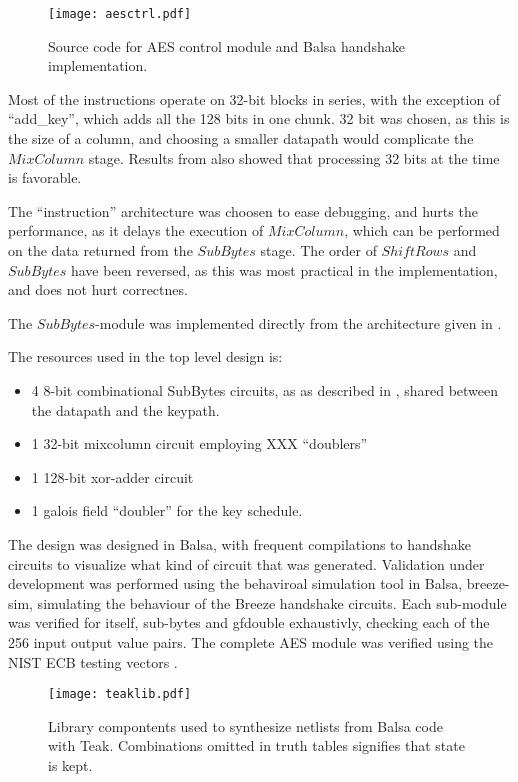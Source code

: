 \begin{figure}[htbp]
  \centering
  \texttt{[image: aesctrl.pdf]}
  \caption{Source code for AES control module and Balsa handshake
    implementation.}
  \label{fig:aesctrl}
\end{figure}

Most of the instructions operate on 32-bit blocks in series, with the
exception of ``add\_key'', which adds all the 128 bits in one
chunk. 32 bit was chosen, as this is the size of a column, and
choosing a smaller datapath would complicate the $MixColumn$
stage. Results from \cite{ekelund} also showed that processing 32 bits
at the time is favorable.

The ``instruction'' architecture was choosen to ease debugging, and
hurts the performance, as it delays the execution of $MixColumn$,
which can be performed on the data returned from the $SubBytes$
stage. The order of $ShiftRows$ and $SubBytes$ have been reversed, as
this was most practical in the implementation, and does not hurt
correctnes.

The $SubBytes$-module was implemented directly from the architecture
given in \cite{xxxcsbox}.

The resources used in the top level design is:
\begin{itemize}
   \item 4 8-bit combinational SubBytes circuits, as as described in
     \cite{combsbox}, shared between the datapath and the keypath.
   \item 1 32-bit mixcolumn circuit employing XXX ``doublers''
   \item 1 128-bit xor-adder circuit
   \item 1 galois field ``doubler'' for the key schedule.
\end{itemize}

The design was designed in Balsa, with frequent compilations to
handshake circuits to visualize what kind of circuit that was
generated. Validation under development was performed using the
behaviroal simulation tool in Balsa, breeze-sim, simulating the
behaviour of the Breeze handshake circuits. Each sub-module was
verified for itself, sub-bytes and gfdouble exhaustivly, checking each
of the 256 input output value pairs. The complete AES module was
verified using the NIST ECB testing vectors \cite{nisttest}.

\begin{figure}[htbp]
  \centering
  \texttt{[image: teaklib.pdf]}
  \caption{Library compontents used to synthesize netlists from Balsa
    code with Teak. Combinations omitted in truth tables signifies
    that state is kept.}
  \label{fig:teaklib}
\end{figure}

